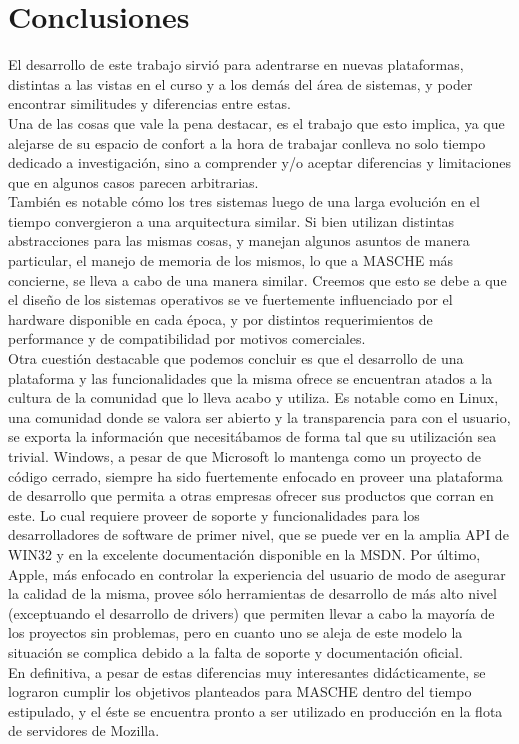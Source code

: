 \section{Conclusiones}

El desarrollo de este trabajo sirvió para adentrarse en nuevas plataformas,
distintas a las vistas en el curso y a los demás del área de sistemas, y poder
encontrar similitudes y diferencias entre estas.\\

Una de las cosas que vale la pena destacar, es el trabajo que esto implica,
ya que alejarse de su espacio de confort a la hora de trabajar conlleva no solo
tiempo dedicado a investigación, sino a comprender y/o aceptar diferencias y
limitaciones que en algunos casos parecen arbitrarias.\\

También es notable cómo los tres sistemas luego de una larga evolución en el
tiempo convergieron a una arquitectura similar. Si bien utilizan distintas
abstracciones para las mismas cosas, y manejan algunos asuntos de manera
particular, el manejo de memoria de los mismos, lo que a MASCHE más concierne,
se lleva a cabo de una manera similar. Creemos que esto se debe a que el diseño
de los sistemas operativos se ve fuertemente influenciado por el hardware
disponible en cada época, y por distintos requerimientos de performance y de
compatibilidad por motivos comerciales.\\

Otra cuestión destacable que podemos concluir es que el desarrollo de una
plataforma y las funcionalidades que la misma ofrece se encuentran atados a la
cultura de la comunidad que lo lleva acabo y utiliza. Es notable como en Linux,
una comunidad donde se valora ser abierto y la transparencia para con el
usuario, se exporta la información que necesitábamos de forma tal que su
utilización sea trivial. Windows, a pesar de que Microsoft lo mantenga como un
proyecto de código cerrado, siempre ha sido fuertemente enfocado en proveer una
plataforma de desarrollo que permita a otras empresas ofrecer sus productos que
corran en este. Lo cual requiere proveer de soporte y funcionalidades
para los desarrolladores de software de primer nivel, que se puede ver en
la amplia API de WIN32 y en la excelente documentación disponible en la MSDN.
Por último, Apple, más enfocado en controlar la experiencia del usuario de modo
de asegurar la calidad de la misma, provee sólo herramientas de desarrollo de
más alto nivel (exceptuando el desarrollo de drivers) que permiten llevar a
cabo la mayoría de los proyectos sin problemas, pero en cuanto uno se aleja de
este modelo la situación se complica debido a la falta de soporte y
documentación oficial.\\

En definitiva, a pesar de estas diferencias muy interesantes didácticamente, se
lograron cumplir los objetivos planteados para MASCHE dentro del tiempo
estipulado, y el éste se encuentra pronto a ser utilizado en producción en la
flota de servidores de Mozilla.\\

